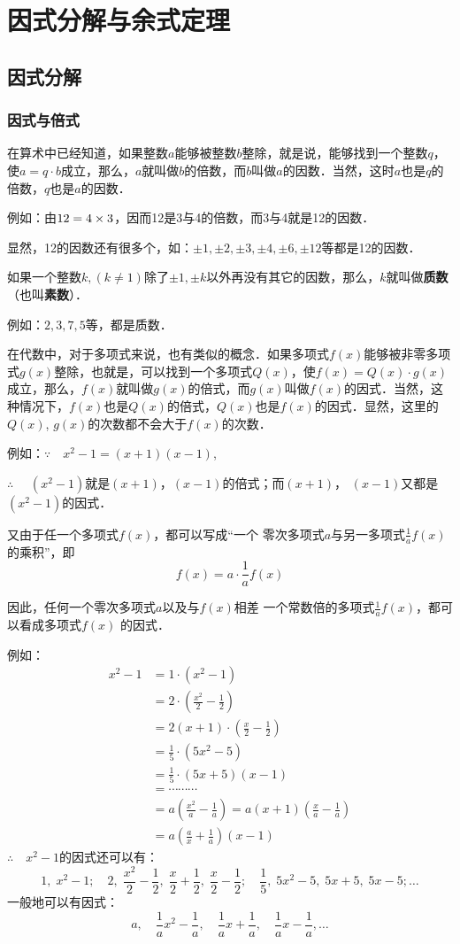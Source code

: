 \chapter{因式分解与余式定理}
\section{因式分解}
\subsection{因式与倍式}

在算术中已经知道，如果整数$a$能够被整数$b$整除，就是说，能够找到一个整数$q$，使$a=q\cdot b$成立，那么，$a$就叫做$b$的倍数，而$b$叫做$a$的因数．当然，这时$a$也是$q$的倍数，$q$也是$a$的因数．

例如：由$12=4\times3$，因而12是3与4的倍数，而3与4就是12的因数．

显然，12的因数还有很多个，如：$\pm1,\pm2,\pm3,\pm4,\pm6,\pm12$等都是12的因数．

如果一个整数$k, (k\ne 1)$除了$\pm1,\pm k$以外再没有其它的因数，那么，$k$就叫做\textbf{质数}（也叫\textbf{素数}）．

例如：$2, 3, 7, 5$等，都是质数．

在代数中，对于多项式来说，也有类似的概念．如果多项式$f(x)$能够被非零多项式$g(x)$整除，也就是，可以找到一个多项式$Q(x)$，使$f(x)=Q(x)\cdot g(x)$成立，那么，$f(x)$就叫做$g(x)$的倍式，而$g(x)$叫做$f(x)$的因式．当然，这种情况下，$f(x)$也是$Q(x)$的倍式，$Q(x)$也是$f(x)$的因式．显然，这里的$Q(x)$, $g(x)$的次数都不会大于$f(x)$的次数．

例如：$\because\quad x^2-1=(x+1)(x-1)$,

$\therefore\quad $ $(x^2-1)$就是$(x+1)$，$(x-1)$的倍式；而$(x+1)$，
$(x-1)$又都是$(x^2-1)$的因式．

又由于任一个多项式$f(x)$，都可以写成“一个
零次多项式$a$与另一多项式$\frac{1}{a}f(x)$的乘积”，即
\[f(x)=a\cdot \frac{1}{a}f(x)\]

因此，任何一个零次多项式$a$以及与$f(x)$相差
一个常数倍的多项式$\frac{1}{a}f(x)$，都可以看成多项式$f(x)$
的因式．

例如：\[\begin{split}
x^2-1&= 1\cdot (x^2-1)\\
&=2\cdot \left(\frac{x^2}{2}-\frac{1}{2}\right)\\    
&=2(x+1)\cdot \left(\frac{x}{2}-\frac{1}{2}\right)\\
&=\frac{1}{5}\cdot (5x^2-5)\\
&=\frac{1}{5}\cdot (5x+5)(x-1)\\
&=\cdots \cdots \cdots \\
&=a\left(\frac{x^2}{a}-\frac{1}{a}\right)=a(x+1)\left(\frac{x}{a}-\frac{1}{a}\right)\\
&=a\left(\frac{a}{x}+\frac{1}{a}\right)(x-1)
\end{split}\]
$\therefore\quad x^2-1$的因式还可以有：
\[1,\; x^2-1;\quad 2,\; \frac{x^2}{2}-\frac{1}{2},\; \frac{x}{2}+\frac{1}{2},\; \frac{x}{2}-\frac{1}{2};\quad \frac{1}{5},\; 5x^2-5,\; 5x+5,\; 5x-5; \ldots \]
一般地可以有因式：
\[a,\quad \frac{1}{a}x^2-\frac{1}{a},\quad \frac{1}{a}x+\frac{1}{a},\quad \frac{1}{a}x-\frac{1}{a},\ldots\]


